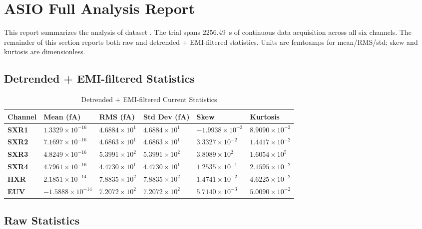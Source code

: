 \documentclass[12pt]{article}
\begin{document}
\section{ASIO Full Analysis Report}

This report summarizes the analysis of dataset . The trial spans 2256.49~s of continuous data acquisition across all six channels.
The remainder of this section reports both raw and detrended + EMI-filtered
statistics. Units are femtoamps for mean/RMS/std; skew and kurtosis are
dimensionless.

\subsection{Detrended + EMI-filtered Statistics}

\begin{table}[H]
\centering
\caption{Detrended + EMI-filtered Current Statistics} \label{tab:full_det_stats}
\begin{tabular}{|C{0.9in}|C{1.08in}|C{1.08in}|C{1.08in}|C{1.08in}|C{1.08in}|}
\hline
\textbf{Channel} & \textbf{Mean (fA)} & \textbf{RMS (fA)} & \textbf{Std Dev (fA)} & \textbf{Skew} & \textbf{Kurtosis} \\
\hline
\textbf{SXR1} & $1.3329 \times 10^{-16}$ & $4.6884 \times 10^{1}$ & $4.6884 \times 10^{1}$ & $-1.9938 \times 10^{-3}$ & $8.9090 \times 10^{-2}$ \\
\hline
\textbf{SXR2} & $7.1697 \times 10^{-16}$ & $4.6863 \times 10^{1}$ & $4.6863 \times 10^{1}$ & $3.3327 \times 10^{-2}$ & $1.4417 \times 10^{-2}$ \\
\hline
\textbf{SXR3} & $4.8249 \times 10^{-16}$ & $5.3991 \times 10^{2}$ & $5.3991 \times 10^{2}$ & $3.8089 \times 10^{2}$ & $1.6054 \times 10^{5}$ \\
\hline
\textbf{SXR4} & $4.7961 \times 10^{-16}$ & $4.4730 \times 10^{1}$ & $4.4730 \times 10^{1}$ & $1.2535 \times 10^{-1}$ & $2.1595 \times 10^{-2}$ \\
\hline
\textbf{HXR} & $2.1851 \times 10^{-14}$ & $7.8835 \times 10^{2}$ & $7.8835 \times 10^{2}$ & $1.4741 \times 10^{-2}$ & $4.6225 \times 10^{-2}$ \\
\hline
\textbf{EUV} & $-1.5888 \times 10^{-14}$ & $7.2072 \times 10^{2}$ & $7.2072 \times 10^{2}$ & $5.7140 \times 10^{-3}$ & $5.0090 \times 10^{-2}$ \\
\hline
\end{tabular}
\end{table}


\subsection{Raw Statistics}
\end{document}
